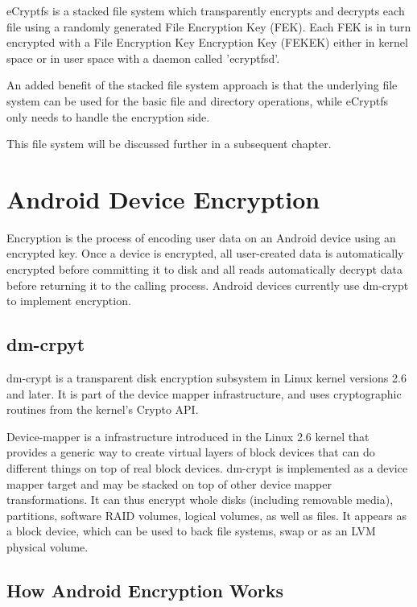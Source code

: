 eCryptfs is a stacked file system which transparently encrypts and decrypts each file using a randomly generated File Encryption Key (FEK). Each FEK is in turn encrypted with a File Encryption Key Encryption Key (FEKEK) either in kernel space or in user space with a daemon called 'ecryptfsd'.

An added benefit of the stacked file system approach is that the underlying file system can be used for the basic file and directory operations, while eCryptfs only needs to handle the encryption side.

This file system will be discussed further in a subsequent chapter.

\section{Android Device Encryption}
\label{sec:and-dev-enc}

Encryption is the process of encoding user data on an Android device using an encrypted key. Once a device is encrypted, all user-created data is automatically encrypted before committing it to disk and all reads automatically decrypt data before returning it to the calling process.
Android devices currently use dm-crypt to implement encryption.

\subsection{dm-crpyt}
\label{sub-sec:dm-crypt}

dm-crypt is a transparent disk encryption subsystem in Linux kernel versions 2.6 and later. It is part of the device mapper infrastructure, and uses cryptographic routines from the kernel's Crypto API.

Device-mapper is a infrastructure introduced in the Linux 2.6 kernel that provides a generic way to create virtual layers of block devices that can do different things on top of real block devices.
dm-crypt is implemented as a device mapper target and may be stacked on top of other device mapper transformations. It can thus encrypt whole disks (including removable media), partitions, software RAID volumes, logical volumes, as well as files. It appears as a block device, which can be used to back file systems, swap or as an LVM physical volume.

\subsection{How Android Encryption Works}
\label{sub-sec:and-enc-works}

